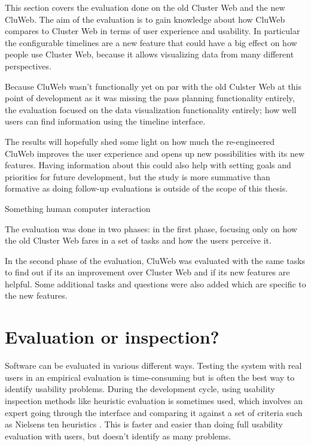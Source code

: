 
This section covers the evaluation done on the old Cluster Web and the new CluWeb. The aim of the evaluation is to gain knowledge about how CluWeb compares to Cluster Web in terms of user experience and usability. In particular the configurable timelines are a new feature that could have a big effect on how people use Cluster Web, because it allows visualizing data from many different perspectives.

Because CluWeb wasn't functionally yet on par with the old Culster Web at this point of development as it was missing the pass planning functionality entirely, the evaluation focused on the data visualization functionality entirely; how well users can find information using the timeline interface.

The results will hopefully shed some light on how much the re-engineered CluWeb improves the user experience and opens up new possibilities with its new features. Having information about this could also help with setting goals and priorities for future development, but the study is more summative than formative as doing follow-up evaluations is outside of the scope of this thesis. \cite{albert2013measuring}

Something human computer interaction \cite{4839639}

The evaluation was done in two phases: in the first phase, focusing only on how the old Cluster Web fares in a set of tasks and how the users perceive it.

In the second phase of the evaluation, CluWeb was evaluated with the same tasks to find out if its an improvement over Cluster Web and if its new features are helpful. Some additional tasks and questions were also added which are specific to the new features.

\section{Evaluation or inspection?}
Software can be evaluated in various different ways. Testing the system with real users in an empirical evaluation is time-consuming but is often the best way to identify usability problems. During the development cycle, using usability inspection methods like heuristic evaluation is sometimes used, which involves an expert going through the interface and comparing it against a set of criteria such as Nielsens ten heuristics \cite{nielsen2005ten, nielsen1995usability}. This is faster and easier than doing full usability evaluation with users, but doesn't identify as many problems.

